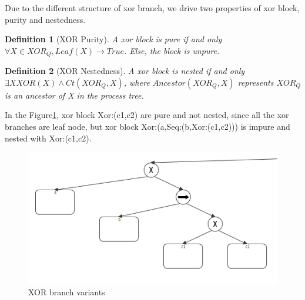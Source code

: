 \documentclass[]{article}
\newtheorem{mydef}{Definition}[section]
\begin{document}
Due to the different structure of xor branch, we drive two properties of xor block, purity and nestedness.
\begin{mydef}[XOR Purity]
	A xor block is pure if and only $\forall X\in XOR_Q, Leaf(X) \rightarrow True$. Else, the block is unpure.
\end{mydef}
\begin{mydef}[XOR Nestedness]
	A xor block is nested if and only $\exists X XOR(X) \land Ct(XOR_Q,X) $, where $Ancestor(XOR_Q,X)$ represents $XOR_Q$ is an ancestor of X in the process tree.
\end{mydef}
In the Figure\ref{fig:xor_branch_variants}, xor block Xor:(c1,c2) are pure and not nested, since all the xor branches are leaf node, but xor block Xor:(a,Seq:(b,Xor:(c1,c2))) is impure and nested with Xor:(c1,c2). 
\begin{figure}[h!]
	\includegraphics[width=\textwidth]{PT02_xor_nested_and_pure.png}
	\caption{XOR branch variants}
	\label{fig:xor_branch_variants}
\end{figure}
\end{document}
